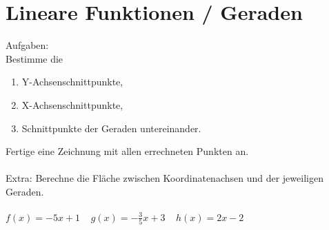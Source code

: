 



\section*{Lineare Funktionen / Geraden}
Aufgaben:\\ Bestimme die
\begin{enumerate}
      \item Y-Achsenschnittpunkte,
      \item X-Achsenschnittpunkte,
      \item Schnittpunkte der Geraden untereinander.
\end{enumerate}
Fertige eine Zeichnung mit allen errechneten Punkten an.\\\\
Extra: Berechne die Fläche zwischen Koordinatenachsen und der jeweiligen Geraden.
\\\\
$f(x)=-5x+1 \;\;\;\; g(x)=-\frac{3}{5}x+3 \;\;\;\; h(x)=2x-2$

